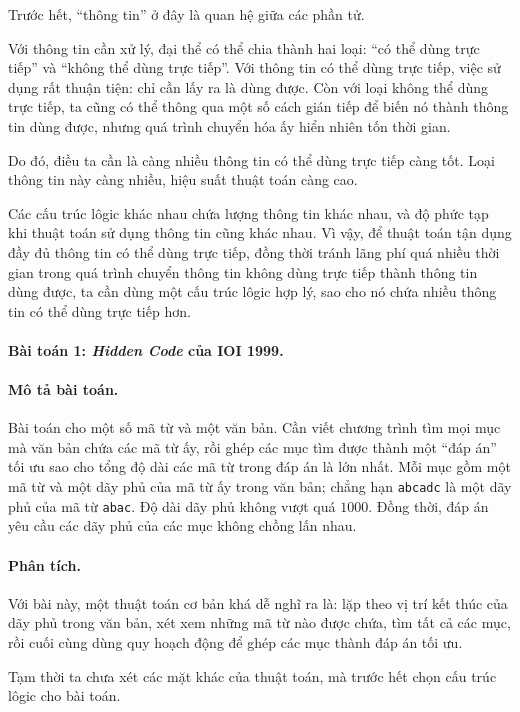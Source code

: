 \documentclass[11pt]{article}
\begin{document}
Trước hết, ``thông tin'' ở đây là quan hệ giữa các phần tử.

Với thông tin cần xử lý, đại thể có thể chia thành hai loại: ``có thể dùng
trực tiếp'' và ``không thể dùng trực tiếp''. Với thông tin có thể dùng trực
tiếp, việc sử dụng rất thuận tiện: chỉ cần lấy ra là dùng được. Còn với loại
không thể dùng trực tiếp, ta cũng có thể thông qua một số cách gián tiếp để
biến nó thành thông tin dùng được, nhưng quá trình chuyển hóa ấy hiển nhiên
tốn thời gian.

Do đó, điều ta cần là càng nhiều thông tin có thể dùng trực tiếp càng tốt.
Loại thông tin này càng nhiều, hiệu suất thuật toán càng cao.

Các cấu trúc lôgic khác nhau chứa lượng thông tin khác nhau, và độ phức tạp
khi thuật toán sử dụng thông tin cũng khác nhau. Vì vậy, để thuật toán tận
dụng đầy đủ thông tin có thể dùng trực tiếp, đồng thời tránh lãng phí quá
nhiều thời gian trong quá trình chuyển thông tin không dùng trực tiếp thành
thông tin dùng được, ta cần dùng một cấu trúc lôgic hợp lý, sao cho nó chứa
nhiều thông tin có thể dùng trực tiếp hơn.

\paragraph{Bài toán 1: \textit{Hidden Code} của IOI 1999.}

\paragraph{Mô tả bài toán.}
Bài toán cho một số mã từ và một văn bản. Cần viết chương trình tìm mọi mục
mà văn bản chứa các mã từ ấy, rồi ghép các mục tìm được thành một ``đáp án''
tối ưu sao cho tổng độ dài các mã từ trong đáp án là lớn nhất. Mỗi mục gồm
một mã từ và một dãy phủ của mã từ ấy trong văn bản; chẳng hạn
\texttt{abcadc} là một dãy phủ của mã từ \texttt{abac}. Độ dài dãy phủ không
vượt quá \(1000\). Đồng thời, đáp án yêu cầu các dãy phủ của các mục không
chồng lấn nhau.

\paragraph{Phân tích.}
Với bài này, một thuật toán cơ bản khá dễ nghĩ ra là: lặp theo vị trí kết thúc
của dãy phủ trong văn bản, xét xem những mã từ nào được chứa, tìm tất cả các
mục, rồi cuối cùng dùng quy hoạch động để ghép các mục thành đáp án tối ưu.

Tạm thời ta chưa xét các mặt khác của thuật toán, mà trước hết chọn cấu trúc
lôgic cho bài toán.
\end{document}
